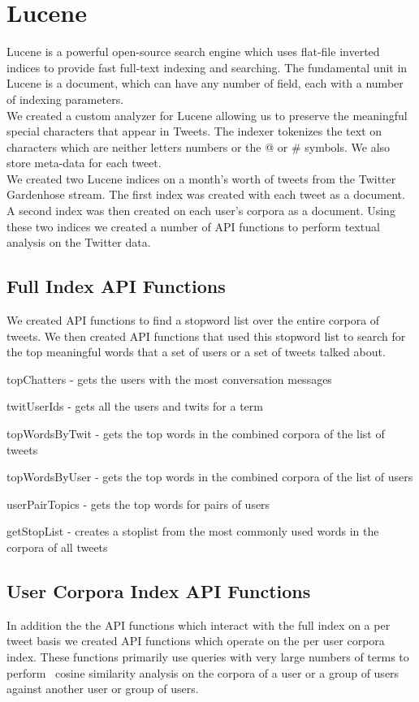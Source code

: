 \section{Lucene}
Lucene is a powerful open-source search engine which uses flat-file inverted indices to provide fast full-text indexing and searching.  The fundamental unit in Lucene is a document, which can have any number of field, each with a number of indexing parameters.\\
We created a custom analyzer for Lucene allowing us to preserve the meaningful special characters that appear in Tweets.  The indexer tokenizes the text on characters which are neither letters numbers or the @ or \# symbols.  We also store meta-data for each tweet.\\
We created two Lucene indices on a month's worth of tweets from the Twitter Gardenhose stream.  The first index was created with each tweet as a document.  A second index was then created on each user's corpora as a document.  Using these two indices we created a number of API functions to perform textual analysis on the Twitter data.\\
\subsection{Full Index API Functions}
We created API functions to find a stopword list over the entire corpora of tweets.  We then created API functions that used this stopword list to search for the top meaningful words that a set of users or a set of tweets talked about.
\begin{list}{.}
{
\setlength{\rightmargin}{\leftmargin}}
\item topChatters - gets the users with the most conversation messages
\item twitUserIds - gets all the users and twits for a term
\item topWordsByTwit - gets the top words in the combined corpora of the list of tweets
\item topWordsByUser - gets the top words in the combined corpora of the list of users
\item userPairTopics - gets the top words for pairs of users
\item getStopList - creates a stoplist from the most commonly used words in the corpora of all tweets
\subsection{User Corpora Index API Functions}
In addition the the API functions which interact with the full index on a per tweet basis we created API functions which operate on the per user corpora index.  These functions primarily use queries with very large numbers of terms to perform  cosine similarity analysis on the corpora of a user or a group of users against another user or group of users.
\end{list}
